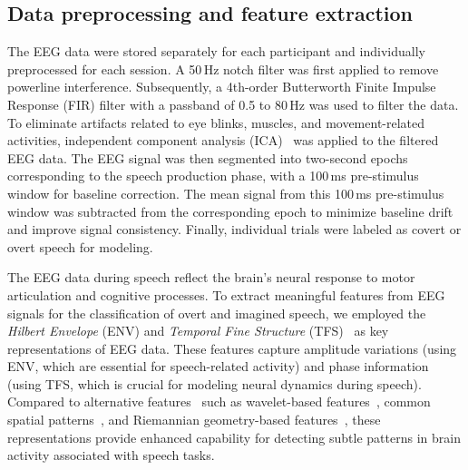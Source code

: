 \documentclass[onecolumn]{IEEEtran}
\begin{document}
\subsection{Data preprocessing and feature extraction}

The EEG data were stored separately for each participant 
and individually preprocessed for each session. 
A 50\,Hz notch filter was first applied to remove powerline interference. 
Subsequently, a 4th-order Butterworth Finite Impulse Response (FIR) filter 
with a passband of 0.5 to 80\,Hz was used to filter the data.
To eliminate artifacts related to eye blinks, muscles, and movement-related activities, 
independent component analysis (ICA)~\cite{iriarte2003independent} 
was applied to the filtered EEG data.
The EEG signal was then segmented into two-second epochs corresponding to the speech production phase, 
with a 100\,ms pre-stimulus window for baseline correction.
The mean signal from this 100\,ms pre-stimulus window was subtracted from the corresponding epoch
to minimize baseline drift and improve signal consistency.
Finally, individual trials were labeled as covert or overt speech for modeling.

The EEG data during speech reflect the brain's neural response to motor articulation and cognitive processes. 
To extract meaningful features from EEG signals for the classification of overt and imagined speech, 
we employed the \textit{Hilbert Envelope} (ENV) 
and \textit{Temporal Fine Structure} (TFS)~\cite{hilbert1989grundzuge,he2016praat} as key representations of EEG data. 
These features capture amplitude variations (using ENV, which are essential for speech-related activity) 
and phase information (using TFS, which is crucial for modeling neural dynamics during speech).
Compared to alternative features~\cite{saeidi2021neural} such as wavelet-based features~\cite{biswas2022wavelet,hernandez2021toward}, common spatial patterns~\cite{wang2013analysis}, and Riemannian geometry-based features~\cite{bakhshali2020eeg}, these representations provide enhanced capability for detecting subtle patterns in brain activity associated with speech tasks.
\end{document}
